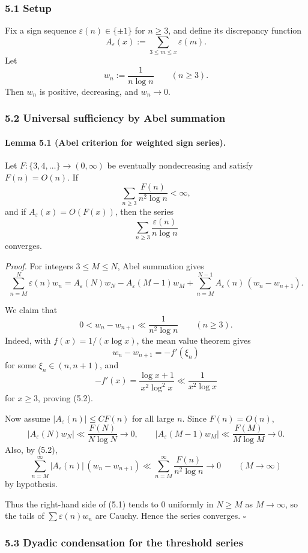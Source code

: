 \subsubsection{5.1 Setup}

Fix a sign sequence $\varepsilon(n)\in\{\pm 1\}$ for $n\ge 3$, and define its discrepancy function
\[
A_\varepsilon(x):=\sum_{3\le m\le x}\varepsilon(m).
\]
Let
\[
w_n:=\frac{1}{n\log n}\qquad (n\ge 3).
\]
Then $w_n$ is positive, decreasing, and $w_n\to 0$.

\subsubsection{5.2 Universal sufficiency by Abel summation}

\paragraph{Lemma 5.1 (Abel criterion for weighted sign series).}
Let $F:\{3,4,\dots\}\to (0,\infty)$ be eventually nondecreasing and satisfy $F(n)=O(n)$.  If
\[
\sum_{n\ge 3}\frac{F(n)}{n^2\log n}<\infty,
\]
and if $A_\varepsilon(x)=O(F(x))$, then the series
\[
\sum_{n\ge 3}\frac{\varepsilon(n)}{n\log n}
\]
converges.


\emph{Proof.}
For integers $3\le M\le N$, Abel summation gives
\[
\sum_{n=M}^{N}\varepsilon(n)w_n
= A_\varepsilon(N)w_N - A_\varepsilon(M-1)w_M + \sum_{n=M}^{N-1} A_\varepsilon(n)\,(w_n-w_{n+1}).
\tag{5.1}
\]

We claim that
\[
0<w_n-w_{n+1}\ll \frac{1}{n^2\log n} \qquad (n\ge 3).
\tag{5.2}
\]
Indeed, with $f(x)=1/(x\log x)$, the mean value theorem gives
\[
w_n-w_{n+1} = -f'(\xi_n)
\]
for some $\xi_n\in(n,n+1)$, and
\[
-f'(x)=\frac{\log x+1}{x^2\log^2 x}
\ll \frac{1}{x^2\log x}
\]
for $x\ge 3$, proving (5.2).

Now assume $|A_\varepsilon(n)|\le C F(n)$ for all large $n$.  Since $F(n)=O(n)$,
\[
|A_\varepsilon(N)w_N| \ll \frac{F(N)}{N\log N}\to 0,
\qquad
|A_\varepsilon(M-1)w_M| \ll \frac{F(M)}{M\log M}\to 0.
\tag{5.3}
\]
Also, by (5.2),
\[
\sum_{n=M}^{\infty}|A_\varepsilon(n)|\,(w_n-w_{n+1})
\ll \sum_{n=M}^{\infty}\frac{F(n)}{n^2\log n}\to 0
\qquad (M\to\infty)
\tag{5.4}
\]
by hypothesis.

Thus the right-hand side of (5.1) tends to $0$ uniformly in $N\ge M$ as $M\to\infty$, so the tails of $\sum \varepsilon(n)w_n$ are Cauchy. Hence the series converges.
\hfill$\square$

\subsubsection{5.3 Dyadic condensation for the threshold series}

